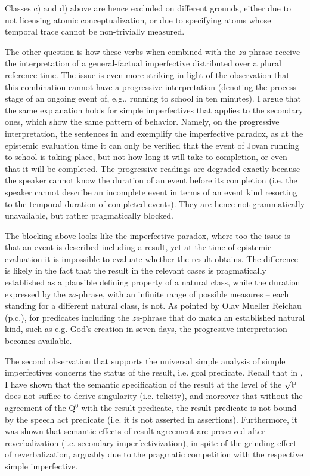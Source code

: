 \documentclass[output=paper]{langscibook}
\begin{document}
\noindent Classes c) and d) above are hence excluded on different grounds, either due to not licensing atomic conceptualization, or due to specifying atoms whose temporal trace cannot be non-trivially measured.

The other question is how these verbs when combined with the \textit{za}-phrase receive the interpretation of a general-factual imperfective distributed over a plural reference time. The issue is even more striking in light of the observation that this combination cannot have a progressive interpretation (denoting the process stage of an ongoing event of, e.g., running to school in ten minutes). I argue that the same explanation holds for simple imperfectives that applies to the secondary ones, which show the same pattern of behavior. Namely, on the progressive interpretation, the sentences in  and  exemplify the imperfective paradox, as at the epistemic evaluation time it can only be verified that the event of Jovan running to school is taking place, but not how long it will take to completion, or even that it will be completed. The progressive readings are degraded exactly because the speaker cannot know the duration of an event before its completion (i.e. the speaker cannot describe an incomplete event in terms of an event kind resorting to the temporal duration of completed events). They are hence not grammatically unavailable, but rather pragmatically blocked. 

The blocking above looks like the imperfective paradox, where too the issue is that an event is described including a result, yet at the time of epistemic evaluation it is impossible to evaluate whether the result obtains. The difference is likely in the fact that the result in the relevant cases is pragmatically established as a plausible defining property of a natural class, while the duration expressed by the \textit{za}-phrase, with an infinite range of possible measures -- each standing for a different natural class, is not. As pointed by Olav Mueller Reichau (p.c.), for predicates including the \textit{za}-phrase that do match an established natural kind, such as e.g. God's creation in seven days, the progressive interpretation becomes available.

The second observation that supports the universal simple analysis of simple imperfectives concerns the status of the result, i.e. goal predicate. Recall that in , I have shown that the semantic specification of the result at the level of the $\surd\text{P}$ does not suffice to derive singularity (i.e. telicity), and moreover that without the agreement of the Q$^0$ with the result predicate, the result predicate is not bound by the speech act predicate (i.e. it is not asserted in assertions). Furthermore, it was shown that semantic effects of result agreement are preserved after reverbalization (i.e. secondary imperfectivization), in spite of the grinding effect of reverbalization, arguably due to the pragmatic competition with the respective simple imperfective. 
\end{document}
